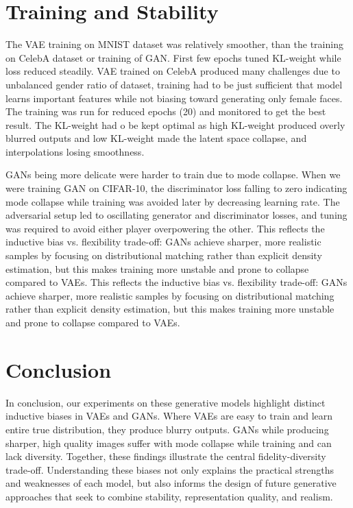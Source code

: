 \documentclass[twocolumn]{article}
\begin{document}
\section{Training and Stability}

The VAE training on MNIST dataset was relatively smoother, than the training on CelebA dataset or training of GAN. First few epochs tuned KL-weight while loss reduced steadily. 
VAE trained on CelebA produced many challenges due to unbalanced gender ratio of dataset, training had to be just sufficient that model learns important features while not biasing 
toward generating only female faces. The training was run for reduced epochs (20) and monitored to get the best result. The KL-weight had o be kept optimal as high KL-weight produced 
overly blurred outputs and low KL-weight made the latent space collapse, and interpolations losing smoothness.

GANs being more delicate were harder to train due to mode collapse. When we were training GAN on CIFAR-10, the discriminator loss falling to zero indicating mode collapse while training 
was avoided later by decreasing learning rate. The adversarial setup led to oscillating generator and discriminator losses, and tuning was required to avoid either player overpowering the other. 
This reflects the inductive bias vs. flexibility trade-off: GANs achieve sharper, more realistic samples by focusing on distributional matching rather than explicit density estimation, but this makes 
training more unstable and prone to collapse compared to VAEs. This reflects the inductive bias vs. flexibility trade-off: GANs achieve sharper, more realistic samples by focusing on distributional matching 
rather than explicit density estimation, but this makes training more unstable and prone to collapse compared to VAEs.

\section{Conclusion}

In conclusion, our experiments on these generative models highlight distinct inductive biases in VAEs and GANs. Where VAEs are easy to train and learn entire true distribution, they produce blurry outputs. 
GANs while producing sharper, high quality images suffer with mode collapse while training and can lack diversity. Together, these findings illustrate the central fidelity-diversity trade-off. Understanding these biases 
not only explains the practical strengths and weaknesses of each model, but also informs the design of future generative 
approaches that seek to combine stability, representation quality, and realism.
\end{document}

